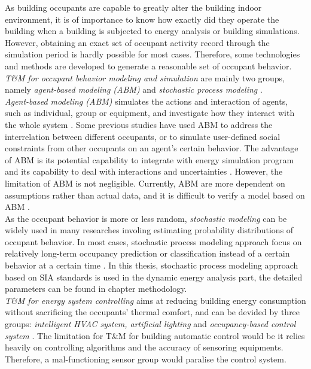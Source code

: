 			As building occupants are capable to greatly alter the building indoor environment, it is of importance to know how exactly did they operate the building when a building is subjected to energy analysis or building simulations. However, obtaining an exact set of occupant activity record through the simulation period is hardly possible for most cases. Therefore, some technologies and methods are developed to generate a reasonable set of occupant behavior. \textit{T\&M for occupant behavior modeling and simulation} are mainly two groups, namely \textit{agent-based modeling (ABM)} and \textit{stochastic process modeling} \cite{ZOU2018165}.\\

			\textit{Agent-based modeling (ABM)} simulates the actions and interaction of agents, such as individual, group or equipment, and investigate how they interact with the whole system \cite{jia2017occupancy}. Some previous studies have used ABM to address the interrelation between different occupants, or to simulate user-defined social constraints from other occupants on an agent's certain behavior. The advantage of ABM is its potential capability to integrate with energy simulation program and its capability to deal with interactions and uncertainties \cite{ZOU2018165}. However, the limitation of ABM is not negligible. Currently, ABM are more dependent on assumptions rather than actual data, and it is difficult to verify a model based on ABM \cite{ZOU2018165,jia2017occupancy}. \\


			As the occupant behavior is more or less random, \textit{stochastic modeling} can be widely used in many researches involing estimating probability distributions of occupant behavior. In most cases, stochastic process modeling approach focus on relatively long-term occupancy prediction or classification instead of a certain behavior at a certain time \cite{ZOU2018165}.
			In this thesis, stochastic process modeling approach based on SIA standards is used in the dynamic energy analysis part, the detailed parameters can be found in chapter methodology.\\

			\textit{T\&M for energy system controlling} aims at reducing building energy consumption without sacrificing the occupants' thermal comfort, and can be devided by three groups: \textit{intelligent HVAC system, artificial lighting} and \textit{occupancy-based control system} \cite{ZOU2018165,hong2015review}. The limitation for T\&M for building automatic control would be it relies heavily on controlling algorithms and the accuracy of sensoring equipments. Therefore, a mal-functioning sensor group would paralise the control system.



